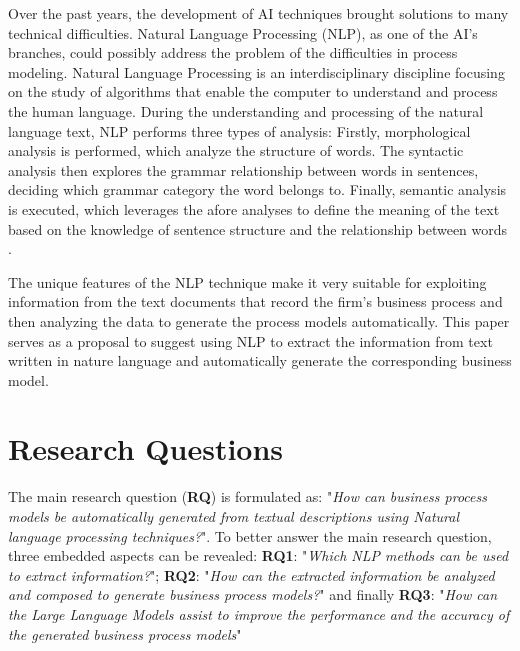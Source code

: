 	Over the past years, the development of AI techniques brought solutions to many technical difficulties. Natural Language Processing (NLP), as one of the AI's branches, could possibly address the problem of the difficulties in process modeling. Natural Language Processing is an interdisciplinary discipline focusing on the study of algorithms that enable the computer to understand and process the human language\cite{t2m_3}. During the understanding and processing of the natural language text, NLP performs three types of analysis: Firstly, morphological analysis is performed, which analyze the structure of words. The syntactic analysis then explores the grammar relationship between words in sentences, deciding which grammar category the word belongs to. Finally, semantic analysis is executed, which leverages the afore analyses to define the meaning of the text based on the knowledge of sentence structure and the relationship between words \cite{literature_review_2}. 
	
	The unique features of the NLP technique make it very suitable for exploiting information from the text documents that record the firm's business process and then analyzing the data to generate the process models automatically. This paper serves as a proposal to suggest using NLP to extract the information from text written in nature language and automatically generate the corresponding business model.

\section{Research Questions}
\label{sec:intro:rq}

%

	The main research question (\textbf{RQ}) is formulated as: "\textit{How can business process models be automatically generated from textual descriptions using Natural language processing techniques?}". To better answer the main research question, three embedded aspects can be revealed: \textbf{RQ1}: "\textit{Which NLP methods can be used to extract information?}"; \textbf{RQ2}: "\textit{How can the extracted information be analyzed and composed to generate business process models?}" and finally \textbf{RQ3}: "\textit{How can the Large Language Models assist to improve the performance and the accuracy of the generated business process models}"


